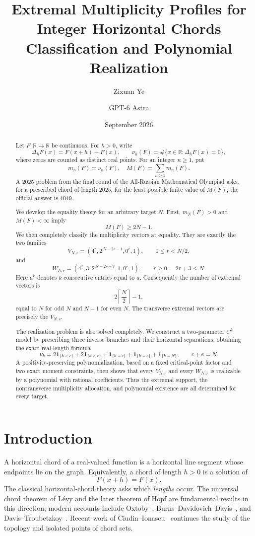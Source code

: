 \documentclass[11pt]{article}
\title{\textbf{Extremal Multiplicity Profiles for Integer Horizontal Chords}\\
\large Classification and Polynomial Realization}
\author{Zixuan Ye \and GPT-6 Astra}
\date{September 2026}
\theoremstyle{definition}
\theoremstyle{remark}
\newcommand{\R}{\mathbb{R}}
\newcommand{\ind}{\mathbf{1}}
\begin{document}
\maketitle

\begin{abstract}
Let \(F:\R\to\R\) be continuous.  For \(h>0\), write
\[
\Delta_hF(x)=F(x+h)-F(x),\qquad
\nu_h(F)=\#\{x\in\R:\Delta_hF(x)=0\},
\]
where zeros are counted as distinct real points.  For an integer \(n\ge1\), put
\[
m_n(F)=\nu_n(F),\quad M(F)=\sum_{n\ge1}m_n(F).\]
A 2025 problem from the final round of the All-Russian Mathematical Olympiad
asks, for a prescribed chord of length \(2025\), for the least possible finite
value of \(M(F)\); the official answer is \(4049\).

We develop the equality theory for an arbitrary target \(N\).
First, \(m_N(F)>0\) and \(M(F)<\infty\) imply
\[
M(F)\ge 2N-1.
\]
We then completely classify the multiplicity vectors at equality.  They are
exactly the two families
\[
V_{N,r}=(4^r,2^{\,N-2r-1},0^r,1),
\qquad 0\le r<N/2,
\]
and
\[
W_{N,r}=(4^r,3,2^{\,N-2r-3},1,0^r,1),
\qquad r\ge0,\quad 2r+3\le N.
\]
Here \(a^k\) denotes \(k\) consecutive entries equal to \(a\).
Consequently the number of extremal vectors is
\[
2\left\lceil\frac N2\right\rceil-1,
\]
equal to \(N\) for odd \(N\) and \(N-1\) for even \(N\).
The transverse extremal vectors are precisely the \(V_{N,r}\).

The realization problem is also solved completely.  We construct a
two-parameter \(C^2\) model by prescribing three inverse branches and their
horizontal separations, obtaining the exact real-length formula
\[
\nu_h
=
2\ind_{\{h<c\}}+2\ind_{\{h<e\}}
+\ind_{\{h=c\}}+\ind_{\{h=e\}}+\ind_{\{h=N\}},
\qquad c+e=N.
\]
A positivity-preserving polynomialization, based on a fixed critical-point
factor and two exact moment constraints, then shows that every \(V_{N,r}\)
and every \(W_{N,r}\) is realizable by a polynomial with rational
coefficients.  Thus the extremal support, the nontransverse multiplicity
allocation, and polynomial existence are all determined for every target.
\end{abstract}

\tableofcontents

\section{Introduction}

A horizontal chord of a real-valued function is a horizontal line segment
whose endpoints lie on the graph.  Equivalently, a chord of length \(h>0\)
is a solution of
\[
F(x+h)=F(x).
\]
The classical horizontal-chord theory asks which \emph{lengths} occur.
The universal chord theorem of L\'evy and the later theorem of Hopf are
fundamental results in this direction; modern accounts include
Oxtoby~\cite{Oxtoby1972}, Burns--Davidovich--Davis~\cite{BurnsDavidovichDavis2017},
and Davis--Troubetzkoy~\cite{DavisTroubetzkoy2024}.  Recent work of
Ciudin--Ionascu~\cite{CiudinIonascu2026} continues the study of the topology
and isolated points of chord sets.
\end{document}
